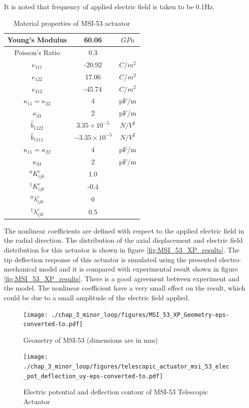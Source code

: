 It is noted that frequency of applied electric field is taken to be 0.1Hz. 
\begin{table}
\caption{Material properties of MSI-53 actuator \cite{Alexander}}
\centering
\begin{tabular}{ c c c } \hline
Young's Modulus&60.06&$GPa$\\ \hline
Poisson's Ratio&$0.3$&\\ 
$e_{111}$ &-20.92&$C/m^2$\\
$e_{122}$ &17.06&$C/m^2$\\
$e_{212}$ &-45.74&$C/m^2$\\
$\kappa_{11}=\kappa_{22}$ & 4 & pF/m\\
$\kappa_{33}$ & 2 & pF/m \\
$\widehat{b}_{1122} $ & $3.35 \times 10^{-5}$ &  $N/V^2$ \\
$\widehat{b}_{1111} $ & $-3.35 \times 10^{-5}$ & $N/V^2$ \\
$\kappa_{11}=\kappa_{22}$ & 4 & pF/m \\
$\kappa_{33}$ & 2 & pF/m \\
${}^{0}K_{ijk}^{e}$&1.0&\\
${}^{1}K_{ijk}^{e}$&-0.4&\\
${}^{0}\lambda_{ijk}^{e}$&0&\\
${}^{1}\lambda_{ijk}^{e}$&0.5&\\ \hline 
\end{tabular}
\label{table:MatPZT_MSI_53} 
\end{table}
The nonlinear coefficients are defined with respect to the applied electric field in the radial direction.
The distribution of the axial displacement and electric field distribution for this actuator is shown in figure \ref{fig:MSI_53_XP_results}. 
The tip deflection response of this actuator is simulated using the presented electro-mechanical model and it is compared with experimental result shown in figure \ref{fig:MSI_53_XP_results}. 
There is a good agreement between experiment and the model. 
The nonlinear coefficient have a very small effect on the result, which could be due to a small amplitude of the electric field applied.

\begin{figure}
\centering
\texttt{[image: ./chap\_3\_minor\_loop/figures/MSI\_53\_XP\_Geometry-eps-converted-to.pdf]}
\caption{Geometry of MSI-53 (dimensions are in mm)}
\label{fig:MSI_53_Geometry}
\end{figure}


\begin{figure}
\centering
\texttt{[image: ./chap\_3\_minor\_loop/figures/telescopic\_actuator\_msi\_53\_elec\_pot\_deflection\_uy-eps-converted-to.pdf]}
\caption{Electric potential and deflection contour of MSI-53 Telescopic Actuator}   
\label{fig:MSI_53_XP_contour}  
\end{figure}
 

